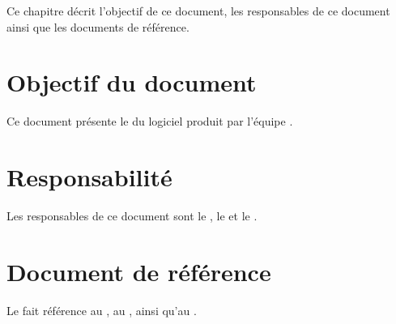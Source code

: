 	Ce chapitre décrit l'objectif de ce document, les responsables de ce document ainsi que les documents de référence.

\section{Objectif du document}
	Ce document présente le \PTI{} du logiciel produit par l'équipe \nomEquipe{}.
	
\section{Responsabilité}
	Les responsables de ce document sont le \CP, le \RQ{} et le \RD.
	
\section{Document de référence}
	Le \PTI{} fait référence au \JTI, au \PTU, ainsi qu'au \JTU.
